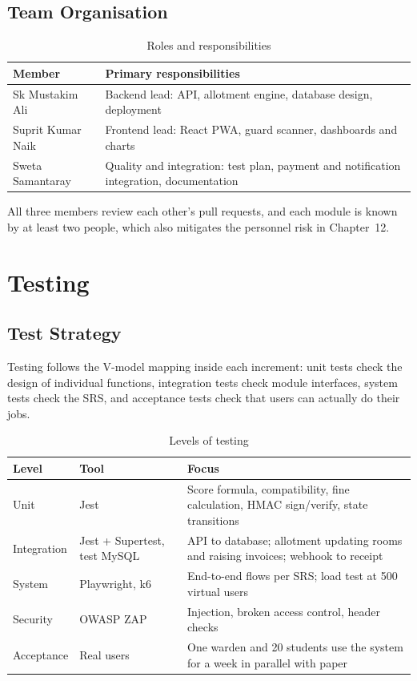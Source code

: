 \documentclass[11pt,a4paper]{report}
\begin{document}
\section{Team Organisation}
\begin{table}[H]
\centering\small
\caption{Roles and responsibilities}\label{tab:team}
\begin{tabularx}{\textwidth}{lL}
\toprule
\textbf{Member} & \textbf{Primary responsibilities}\\
\midrule
Sk Mustakim Ali & Backend lead: API, allotment engine, database design, deployment\\
Suprit Kumar Naik & Frontend lead: React PWA, guard scanner, dashboards and charts\\
Sweta Samantaray & Quality and integration: test plan, payment and notification integration, documentation\\
\bottomrule
\end{tabularx}
\end{table}
All three members review each other's pull requests, and each module is known by at least two people, which also mitigates the personnel risk in Chapter~12.

\chapter{Testing}

\section{Test Strategy}
Testing follows the V-model mapping inside each increment: unit tests check the design of individual functions, integration tests check module interfaces, system tests check the SRS, and acceptance tests check that users can actually do their jobs.

\begin{table}[H]
\centering\small
\caption{Levels of testing}\label{tab:levels}
\begin{tabularx}{\textwidth}{llL}
\toprule
\textbf{Level} & \textbf{Tool} & \textbf{Focus}\\
\midrule
Unit & Jest & Score formula, compatibility, fine calculation, HMAC sign/verify, state transitions\\
Integration & Jest + Supertest, test MySQL & API to database; allotment updating rooms and raising invoices; webhook to receipt\\
System & Playwright, k6 & End-to-end flows per SRS; load test at 500 virtual users\\
Security & OWASP ZAP & Injection, broken access control, header checks\\
Acceptance & Real users & One warden and 20 students use the system for a week in parallel with paper\\
\bottomrule
\end{tabularx}
\end{table}
\end{document}
